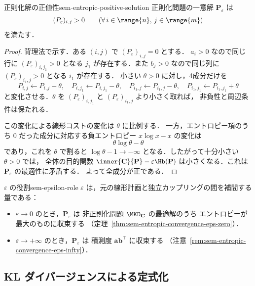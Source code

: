 \begin{proposition}{正則化解の正値性}{sem-entropic-positive-solution}
  正則化問題の一意解 $\mathbf{P}_\varepsilon$ は
  \[
    (P_\varepsilon)_{i,j} > 0
    \qquad(\forall\, i \in \range{n},\, j \in \range{m})
  \]
  を満たす．
\end{proposition}

\begin{proof}
  背理法で示す．ある $(i,j)$ で
  $(P_\varepsilon)_{i,j}=0$ とする．
  $a_i>0$ なので同じ行に $(P_\varepsilon)_{i,j_1}>0$ となる
  $j_1$ が存在する．また $b_j>0$ なので同じ列に
  $(P_\varepsilon)_{i_1,j}>0$ となる $i_1$ が存在する．
  小さい $\theta>0$ に対し，4成分だけを
  \[
    P_{i,j} \leftarrow P_{i,j}+\theta,\quad
    P_{i,j_1} \leftarrow P_{i,j_1}-\theta,\quad
    P_{i_1,j} \leftarrow P_{i_1,j}-\theta,\quad
    P_{i_1,j_1} \leftarrow P_{i_1,j_1}+\theta
  \]
  と変化させる．$\theta$ を
  $(P_\varepsilon)_{i,j_1}$ と $(P_\varepsilon)_{i_1,j}$ より小さく取れば，
  非負性と周辺条件は保たれる．

  この変化による線形コストの変化は $\theta$ に比例する．
  一方，エントロピー項のうち $0$ だった成分に対応する負エントロピー
  $x\log x-x$ の変化は
  \[
    \theta\log\theta - \theta
  \]
  であり，これを $\theta$ で割ると $\log\theta-1 \to -\infty$
  となる．したがって十分小さい $\theta>0$ では，
  全体の目的関数
  $\inner{\mathbf{C}}{\mathbf{P}}-\varepsilon\Hb(\mathbf{P})$
  は小さくなる．これは $\mathbf{P}_\varepsilon$ の最適性に矛盾する．
  よって全成分が正である．
\end{proof}

\begin{remark}{$\varepsilon$ の役割}{sem-epsilon-role}
  $\varepsilon$ は，元の線形計画と独立カップリングの間を補間する量である：
  \begin{itemize}
    \item $\varepsilon \to 0$ のとき，$\mathbf{P}_\varepsilon$ は
      非正則化問題 $\MKD_{\mathbf{C}}$ の最適解のうち
      エントロピーが最大のものに収束する
      （定理~\ref{thm:sem-entropic-convergence-eps-zero}）．
    \item $\varepsilon \to +\infty$ のとき，$\mathbf{P}_\varepsilon$ は
      積測度 $\mathbf{a} \mathbf{b}^\top$ に収束する
      （注意~\ref{rem:sem-entropic-convergence-eps-infty}）．
  \end{itemize}
\end{remark}

\subsection{KL ダイバージェンスによる定式化}
\label{subsec:sem-kl-formulation}

